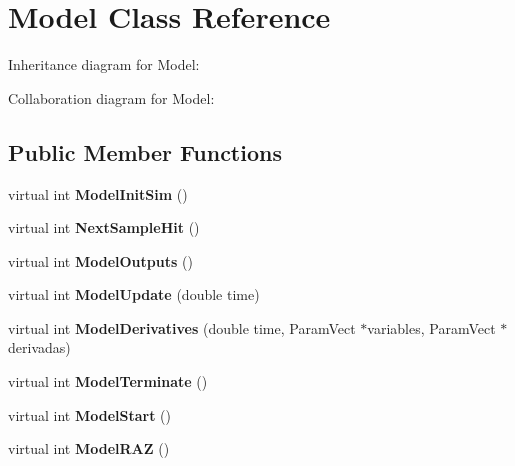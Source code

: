 \hypertarget{classModel}{}\section{Model Class Reference}
\label{classModel}


Inheritance diagram for Model\+:


Collaboration diagram for Model\+:
\subsection*{Public Member Functions}
\begin{DoxyCompactItemize}
\item 
virtual int {\bfseries Model\+Init\+Sim} ()\hypertarget{classModel_ae8ba7da585f7c4f25571533c095f2273}{}\label{classModel_ae8ba7da585f7c4f25571533c095f2273}

\item 
virtual int {\bfseries Next\+Sample\+Hit} ()\hypertarget{classModel_a78e4915f0224ef2550200da170f97939}{}\label{classModel_a78e4915f0224ef2550200da170f97939}

\item 
virtual int {\bfseries Model\+Outputs} ()\hypertarget{classModel_afed286e21c3640a0768cafd3efd0c5c9}{}\label{classModel_afed286e21c3640a0768cafd3efd0c5c9}

\item 
virtual int {\bfseries Model\+Update} (double time)\hypertarget{classModel_a0bc7b85657eaabed14a338f37ea7cd98}{}\label{classModel_a0bc7b85657eaabed14a338f37ea7cd98}

\item 
virtual int {\bfseries Model\+Derivatives} (double time, Param\+Vect $\ast$variables, Param\+Vect $\ast$derivadas)\hypertarget{classModel_abddbc4bf9083ff32aea89a2b465b296c}{}\label{classModel_abddbc4bf9083ff32aea89a2b465b296c}

\item 
virtual int {\bfseries Model\+Terminate} ()\hypertarget{classModel_a5091324e287b047d30ece889725c2dc4}{}\label{classModel_a5091324e287b047d30ece889725c2dc4}

\item 
virtual int {\bfseries Model\+Start} ()\hypertarget{classModel_a0127158c79af72decc3e188c841fc947}{}\label{classModel_a0127158c79af72decc3e188c841fc947}

\item 
virtual int {\bfseries Model\+R\+AZ} ()\hypertarget{classModel_a2e7b56b6cb4096dac08b976e7e97c345}{}\label{classModel_a2e7b56b6cb4096dac08b976e7e97c345}


\end{DoxyCompactItemize}
